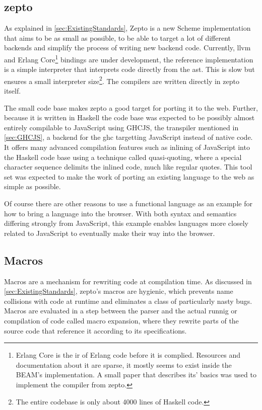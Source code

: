 \documentclass[oneside,11pt,xetex]{scrbook}
\begin{document}
\subsection{zepto}

As explained in \ref{sec:ExistingStandards}, Zepto is a new Scheme implementation that aims
to be as small as possible, to be able to target a lot of different backends and simplify the
process of writing new backend code. Currently, \gls{llvm} and Erlang Core\footnote{Erlang Core 
is the \gls{ir} of Erlang code before it is complied. Resources and documentation
about it are sparse, it mostly seems to exist inside the BEAM's implementation. A small
paper \parencite{ERL} that describes its' basics was used to implement the compiler from
zepto.} bindings are under development, the reference implementation is a simple interpreter
that interprets code directly from the \gls{ast}. This is slow but ensures a small
interpreter size\footnote{The entire codebase is only about 4000 lines of Haskell code.}.
The compilers are written directly in zepto itself.

The small code base makes zepto a good target for porting it to the web. Further, because it
is written in Haskell the code base was expected to be possibly almost entirely compilable
to JavaScript using GHCJS, the transpiler mentioned in \ref{sec:GHCJS}, a backend
for the \gls{ghc} targetting JavaScript instead of native code. It offers many advanced
compilation features such as inlining of JavaScript into the Haskell code
base using a technique called quasi-quoting, where a special character sequence delimits the
inlined code, much like regular quotes. This tool set was expected to make the work of porting
an existing language to the web as simple as possible.

Of course there are other reasons to use a functional language as an example for how to
bring a language into the browser. With both syntax
and semantics differing strongly from JavaScript, this example enables languages more
closely related to JavaScript to eventually make their way into the browser.

\subsection{Macros}
\label{macro}

Macros are a mechanism for rewriting code at compilation time. As discussed in
\ref{sec:ExistingStandards}, zepto's macros are hygienic, which prevents name collisions
with code at runtime and eliminates a class of particularly nasty bugs. Macros are
evaluated in a step between the parser and the actual runnig or compilation of code
called macro expansion, where they rewrite parts of the source code that reference
it according to its specifications.
\end{document}
